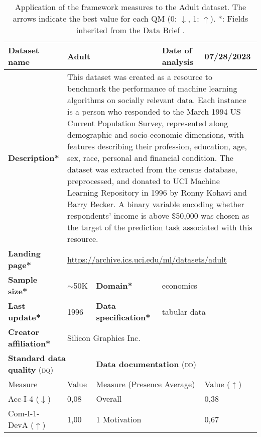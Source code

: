 \begin{table}[h]
    \caption{Application of the framework measures to the Adult dataset. The arrows indicate the best value for each QM (0: $\downarrow$, 1: $\uparrow$). *: Fields inherited from the Data Brief \cite{fabrisAlgorithmicFairnessDatasets2022}.}
    \label{tab:Adult}
    \begin{tabular}{|p{3cm}|p{1.9cm}p{3cm}p{2.6cm}p{1.6cm}|}
        \hline
        \textbf{Dataset name} & \multicolumn{2}{l|}{Adult} & \multicolumn{1}{l|}{\textbf{Date of analysis}} & 07/28/2023 \\ \hline
        \textbf{Description*} & \multicolumn{4}{p{10cm}|}{This dataset was created as a resource to benchmark the performance of machine learning algorithms on socially relevant data. Each instance is a person who responded to the March 1994 US Current Population Survey, represented along demographic and socio-economic dimensions, with features describing their profession, education, age, sex, race, personal and financial condition. The dataset was extracted from the census database, preprocessed, and donated to UCI Machine Learning Repository in 1996 by Ronny Kohavi and Barry Becker. A binary variable encoding whether respondents’ income is above \$50,000 was chosen as the target of the prediction task associated with this resource.} \\ \hline
        \textbf{Landing page*} & \multicolumn{4}{l|}{\href{https://archive.ics.uci.edu/ml/datasets/adult}{https://archive.ics.uci.edu/ml/datasets/adult}} \\ \hline
        \textbf{Sample size*} & $\sim$50K & \multicolumn{1}{|l}{\textbf{Domain*}} & \multicolumn{2}{|l|}{economics}  \\ \hline
        \textbf{Last update*} & 1996 & \multicolumn{1}{|p{3cm}}{\textbf{Data specification*}} & \multicolumn{2}{|l|}{tabular data} \\ \hline
        \textbf{Creator affiliation*} & \multicolumn{4}{l|}{Silicon Graphics Inc.} \\ \hline\hline
        \multicolumn{2}{|l|}{\textbf{Standard data quality} (\textsc{dq})} & \multicolumn{3}{|l|}{\textbf{Data documentation} (\textsc{dd})}\\ \hline
        Measure & Value & \multicolumn{2}{|l|}{Measure (Presence Average)} & Value ($\uparrow$) \\ \hline
        Acc-I-4 ($\downarrow$) & 0,08\cellcolor[HTML]{FEF6F3} & \multicolumn{2}{|l|}{Overall} & 0,38\cellcolor[HTML]{FDBBA8} \\
        Com-I-1-DevA ($\uparrow$) & 1,00\cellcolor[HTML]{FFFFFF} & \multicolumn{2}{|l|}{1 Motivation} & 0,67\cellcolor[HTML]{FEDAD0} \\

\end{tabular}
\end{table}
